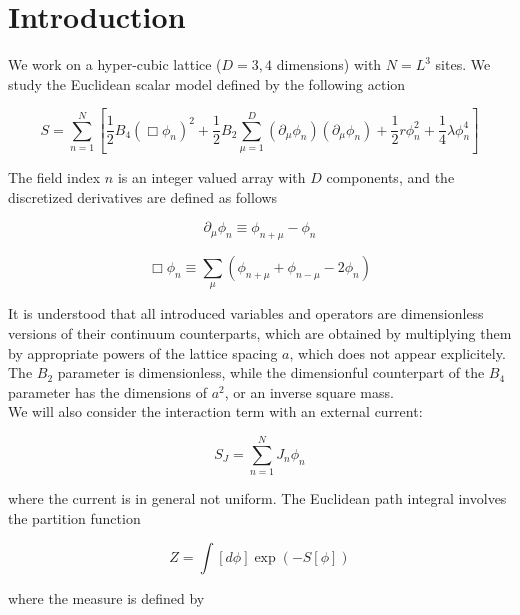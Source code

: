 \documentclass{article}
\begin{document}
\section{Introduction}

We work on a hyper-cubic lattice ($D=3, 4$ dimensions) with $N=L^3$ sites. We study the Euclidean scalar model defined by the following action

\begin{equation}
S = \sum_{n=1}^N \left[ \frac{1}{2} B_4 \left( \Box \phi_n \right)^2 + \frac{1}{2}B_2 \sum_{\mu=1}^D
  \left( \partial_\mu \phi_n \right) \left( \partial_\mu \phi_n \right) + \frac{1}{2} r \phi_n^2 + \frac{1}{4}\lambda \phi_n^4 \right]
\end{equation}

\noindent The field index $n$ is an integer valued array with $D$ components, and the discretized derivatives are defined as follows

\begin{equation}
\partial_\mu \phi_n \equiv \phi_{n+\mu} - \phi_n
\end{equation}

\begin{equation}
\Box \phi_n \equiv \sum_\mu \left( \phi_{n+\mu} + \phi_{n-\mu} - 2\phi_n \right)
\end{equation}

\noindent It is understood that all introduced variables and operators are dimensionless versions of their continuum counterparts, which are obtained by multiplying them by appropriate
powers of the lattice spacing $a$, which does not appear explicitely. The $B_2$ parameter is dimensionless, while the dimensionful counterpart of the $B_4$ parameter has the dimensions of $a^{2}$, or an inverse square mass.\\

\noindent We will also consider the interaction term with an external current:

\begin{equation}
S_J = \sum_{n=1}^N J_n \phi_n 
\end{equation}

\noindent where the current is in general not uniform. The Euclidean path integral involves the partition function

\begin{equation}
Z = \int [d\phi] \exp \left( -S[\phi] \right)
\end{equation}

\noindent where the measure is defined by
\end{document}
